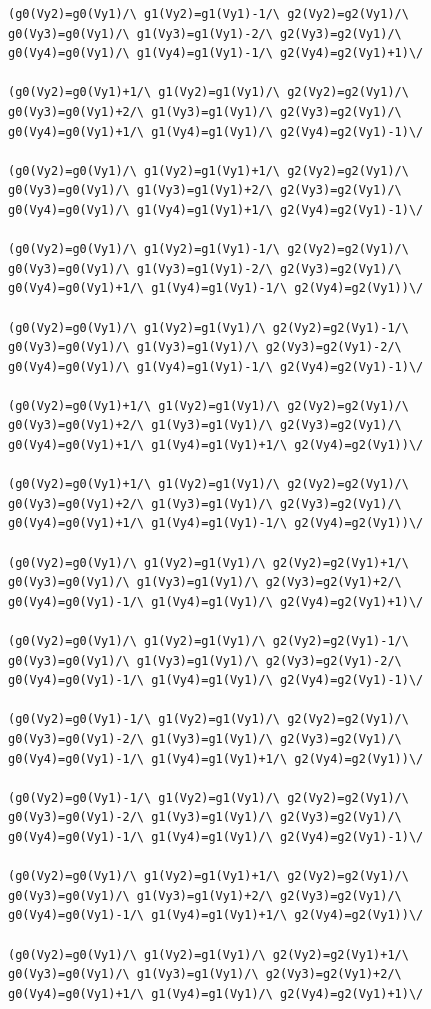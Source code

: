 \begin{appendices}
\begin{lstlisting}
(g0(Vy2)=g0(Vy1)/\ g1(Vy2)=g1(Vy1)-1/\ g2(Vy2)=g2(Vy1)/\ g0(Vy3)=g0(Vy1)/\ g1(Vy3)=g1(Vy1)-2/\ g2(Vy3)=g2(Vy1)/\ g0(Vy4)=g0(Vy1)/\ g1(Vy4)=g1(Vy1)-1/\ g2(Vy4)=g2(Vy1)+1)\/ 

(g0(Vy2)=g0(Vy1)+1/\ g1(Vy2)=g1(Vy1)/\ g2(Vy2)=g2(Vy1)/\ g0(Vy3)=g0(Vy1)+2/\ g1(Vy3)=g1(Vy1)/\ g2(Vy3)=g2(Vy1)/\ g0(Vy4)=g0(Vy1)+1/\ g1(Vy4)=g1(Vy1)/\ g2(Vy4)=g2(Vy1)-1)\/ 

(g0(Vy2)=g0(Vy1)/\ g1(Vy2)=g1(Vy1)+1/\ g2(Vy2)=g2(Vy1)/\ g0(Vy3)=g0(Vy1)/\ g1(Vy3)=g1(Vy1)+2/\ g2(Vy3)=g2(Vy1)/\ g0(Vy4)=g0(Vy1)/\ g1(Vy4)=g1(Vy1)+1/\ g2(Vy4)=g2(Vy1)-1)\/ 

(g0(Vy2)=g0(Vy1)/\ g1(Vy2)=g1(Vy1)-1/\ g2(Vy2)=g2(Vy1)/\ g0(Vy3)=g0(Vy1)/\ g1(Vy3)=g1(Vy1)-2/\ g2(Vy3)=g2(Vy1)/\ g0(Vy4)=g0(Vy1)+1/\ g1(Vy4)=g1(Vy1)-1/\ g2(Vy4)=g2(Vy1))\/ 

(g0(Vy2)=g0(Vy1)/\ g1(Vy2)=g1(Vy1)/\ g2(Vy2)=g2(Vy1)-1/\ g0(Vy3)=g0(Vy1)/\ g1(Vy3)=g1(Vy1)/\ g2(Vy3)=g2(Vy1)-2/\ g0(Vy4)=g0(Vy1)/\ g1(Vy4)=g1(Vy1)-1/\ g2(Vy4)=g2(Vy1)-1)\/ 

(g0(Vy2)=g0(Vy1)+1/\ g1(Vy2)=g1(Vy1)/\ g2(Vy2)=g2(Vy1)/\ g0(Vy3)=g0(Vy1)+2/\ g1(Vy3)=g1(Vy1)/\ g2(Vy3)=g2(Vy1)/\ g0(Vy4)=g0(Vy1)+1/\ g1(Vy4)=g1(Vy1)+1/\ g2(Vy4)=g2(Vy1))\/ 

(g0(Vy2)=g0(Vy1)+1/\ g1(Vy2)=g1(Vy1)/\ g2(Vy2)=g2(Vy1)/\ g0(Vy3)=g0(Vy1)+2/\ g1(Vy3)=g1(Vy1)/\ g2(Vy3)=g2(Vy1)/\ g0(Vy4)=g0(Vy1)+1/\ g1(Vy4)=g1(Vy1)-1/\ g2(Vy4)=g2(Vy1))\/ 

(g0(Vy2)=g0(Vy1)/\ g1(Vy2)=g1(Vy1)/\ g2(Vy2)=g2(Vy1)+1/\ g0(Vy3)=g0(Vy1)/\ g1(Vy3)=g1(Vy1)/\ g2(Vy3)=g2(Vy1)+2/\ g0(Vy4)=g0(Vy1)-1/\ g1(Vy4)=g1(Vy1)/\ g2(Vy4)=g2(Vy1)+1)\/ 

(g0(Vy2)=g0(Vy1)/\ g1(Vy2)=g1(Vy1)/\ g2(Vy2)=g2(Vy1)-1/\ g0(Vy3)=g0(Vy1)/\ g1(Vy3)=g1(Vy1)/\ g2(Vy3)=g2(Vy1)-2/\ g0(Vy4)=g0(Vy1)-1/\ g1(Vy4)=g1(Vy1)/\ g2(Vy4)=g2(Vy1)-1)\/ 

(g0(Vy2)=g0(Vy1)-1/\ g1(Vy2)=g1(Vy1)/\ g2(Vy2)=g2(Vy1)/\ g0(Vy3)=g0(Vy1)-2/\ g1(Vy3)=g1(Vy1)/\ g2(Vy3)=g2(Vy1)/\ g0(Vy4)=g0(Vy1)-1/\ g1(Vy4)=g1(Vy1)+1/\ g2(Vy4)=g2(Vy1))\/ 

(g0(Vy2)=g0(Vy1)-1/\ g1(Vy2)=g1(Vy1)/\ g2(Vy2)=g2(Vy1)/\ g0(Vy3)=g0(Vy1)-2/\ g1(Vy3)=g1(Vy1)/\ g2(Vy3)=g2(Vy1)/\ g0(Vy4)=g0(Vy1)-1/\ g1(Vy4)=g1(Vy1)/\ g2(Vy4)=g2(Vy1)-1)\/ 

(g0(Vy2)=g0(Vy1)/\ g1(Vy2)=g1(Vy1)+1/\ g2(Vy2)=g2(Vy1)/\ g0(Vy3)=g0(Vy1)/\ g1(Vy3)=g1(Vy1)+2/\ g2(Vy3)=g2(Vy1)/\ g0(Vy4)=g0(Vy1)-1/\ g1(Vy4)=g1(Vy1)+1/\ g2(Vy4)=g2(Vy1))\/ 

(g0(Vy2)=g0(Vy1)/\ g1(Vy2)=g1(Vy1)/\ g2(Vy2)=g2(Vy1)+1/\ g0(Vy3)=g0(Vy1)/\ g1(Vy3)=g1(Vy1)/\ g2(Vy3)=g2(Vy1)+2/\ g0(Vy4)=g0(Vy1)+1/\ g1(Vy4)=g1(Vy1)/\ g2(Vy4)=g2(Vy1)+1)\/ 


\end{lstlisting}
\end{appendices}
